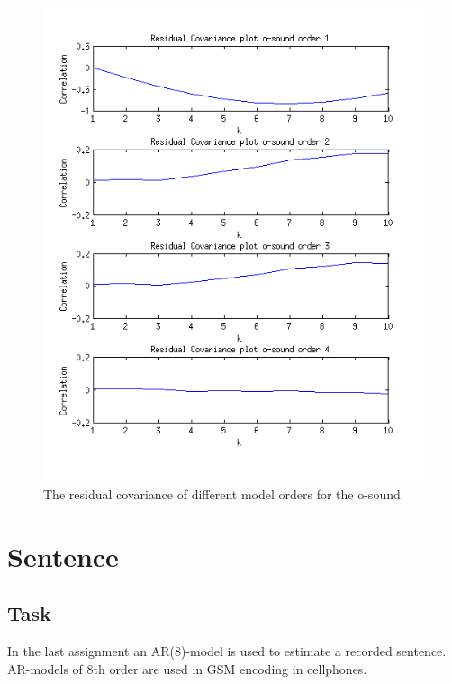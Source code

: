 \documentclass[12pt]{article}
\begin{document}
\begin{figure}[H]
  \centering
  \includegraphics[width=14cm]{residual_covariance_o.png}
  \caption{The residual covariance of different model orders for the o-sound\label{res_cov_o}}
\end{figure}

\clearpage
\section{Sentence}

\subsection{Task}
In the last assignment an AR(8)-model is used to estimate a recorded sentence. AR-models of 8th order are used in GSM encoding in cellphones.
\end{document}
